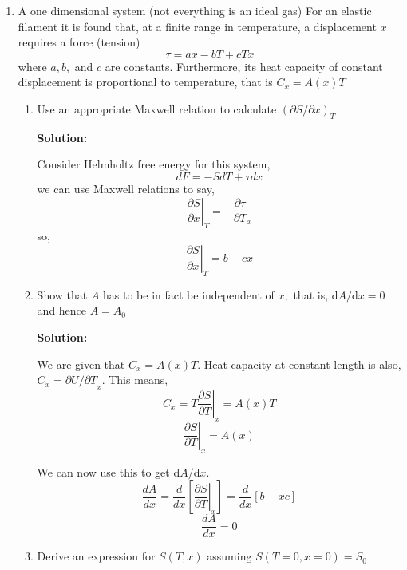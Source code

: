 \documentclass[10pt]{article}
\newenvironment{Solution}
    {\textbf{Solution:}
    
    \vspace{5mm}
    \begin{tcolorbox}
    }
    {
    \end{tcolorbox}
    \vspace{5mm}
    }
\begin{document}
\begin{enumerate}
\item A one dimensional system (not everything is an ideal gas) For an elastic filament it is found that, at a finite range in temperature, a displacement $x$ requires a force (tension)
$$
\tau=a x-b T+c T x
$$
where $a, b,$ and $c$ are constants. Furthermore, its heat capacity of constant displacement is proportional to temperature, that is $C_{x}=A(x) T$
\begin{enumerate}
    \item Use an appropriate Maxwell relation to calculate $(\partial S / \partial x)_{T}$
    
    \begin{Solution}
    Consider Helmholtz free energy for this system,
    \begin{equation}
        dF = - SdT + \tau dx
    \end{equation}
    we can use Maxwell relations to say,
    \begin{equation}
        \left.\frac{\partial S}{\partial x}\right|_T = -\frac{\partial \tau}{\partial T}_x
    \end{equation}
    so, 
    \begin{equation}
        \boxed{\left.\frac{\partial S}{\partial x}\right|_T = b-cx}
    \end{equation}
 
    \end{Solution}
    \item Show that $A$ has to be in fact be independent of $x,$ that is, $\mathrm{d} A / \mathrm{d} x=0$ and hence $A=A_{0}$
    
    \begin{Solution}
    We are given that $C_{x}=A(x) T$. Heat capacity at constant length is also, $C_{x}={\partial U/\partial T}_x $. This means, 
    \begin{equation}
        C_x = T\left.\frac{\partial S}{\partial T}\right|_x = A(x) T
    \end{equation}
    \begin{equation}
        \left.\frac{\partial S}{\partial T}\right|_x = A(x)
    \end{equation}
    
    We can now use this to get $\mathrm{d} A / \mathrm{d} x$.
    \begin{equation}
        \frac{dA}{dx} = \frac{d}{dx}\left[\left.\frac{\partial S}{\partial T}\right|_x\right] = \frac{d}{dx}\left[b-xc\right] 
    \end{equation}
    \begin{equation}
        \boxed{\frac{dA}{dx} = 0 }
    \end{equation}
    \end{Solution}
    \newpage
    \item Derive an expression for $S(T, x)$ assuming $S(T=0, x=0)=S_{0}$
    

\end{enumerate}
\end{enumerate}
\end{document}
